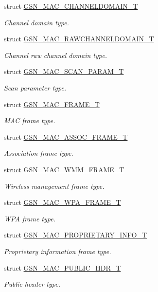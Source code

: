 \begin{DoxyCompactItemize}
struct \hyperlink{a00113}{GSN\_\-MAC\_\-CHANNELDOMAIN\_\-T}
\begin{DoxyCompactList}\small\item\em Channel domain type. \end{DoxyCompactList}\item 
struct \hyperlink{a00127}{GSN\_\-MAC\_\-RAWCHANNELDOMAIN\_\-T}
\begin{DoxyCompactList}\small\item\em Channel raw channel domain type. \end{DoxyCompactList}\item 
struct \hyperlink{a00130}{GSN\_\-MAC\_\-SCAN\_\-PARAM\_\-T}
\begin{DoxyCompactList}\small\item\em Scan parameter type. \end{DoxyCompactList}\item 
struct \hyperlink{a00116}{GSN\_\-MAC\_\-FRAME\_\-T}
\begin{DoxyCompactList}\small\item\em MAC frame type. \end{DoxyCompactList}\item 
struct \hyperlink{a00109}{GSN\_\-MAC\_\-ASSOC\_\-FRAME\_\-T}
\begin{DoxyCompactList}\small\item\em Association frame type. \end{DoxyCompactList}\item 
struct \hyperlink{a00136}{GSN\_\-MAC\_\-WMM\_\-FRAME\_\-T}
\begin{DoxyCompactList}\small\item\em Wireless management frame type. \end{DoxyCompactList}\item 
struct \hyperlink{a00137}{GSN\_\-MAC\_\-WPA\_\-FRAME\_\-T}
\begin{DoxyCompactList}\small\item\em WPA frame type. \end{DoxyCompactList}\item 
struct \hyperlink{a00123}{GSN\_\-MAC\_\-PROPRIETARY\_\-INFO\_\-T}
\begin{DoxyCompactList}\small\item\em Proprietary information frame type. \end{DoxyCompactList}\item 
struct \hyperlink{a00124}{GSN\_\-MAC\_\-PUBLIC\_\-HDR\_\-T}
\begin{DoxyCompactList}\small\item\em Public header type. \end{DoxyCompactList}\item 

\end{DoxyCompactItemize}

